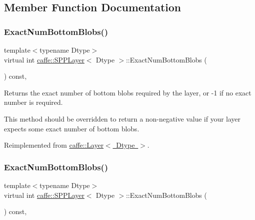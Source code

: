 \subsection{Member Function Documentation}
\mbox{\label{classcaffe_1_1_s_p_p_layer_a0fcc7996823cba1a468e82b3f9058ff0}} 
\subsubsection{\texorpdfstring{Exact\+Num\+Bottom\+Blobs()}{ExactNumBottomBlobs()}\hspace{0.1cm}{\footnotesize\ttfamily [1/2]}}
{\footnotesize\ttfamily template$<$typename Dtype$>$ \\
virtual int \mbox{\hyperlink{classcaffe_1_1_s_p_p_layer}{caffe\+::\+S\+P\+P\+Layer}}$<$ Dtype $>$\+::Exact\+Num\+Bottom\+Blobs (\begin{DoxyParamCaption}{ }\end{DoxyParamCaption}) const\hspace{0.3cm}{\ttfamily [inline]}, {\ttfamily [virtual]}}



Returns the exact number of bottom blobs required by the layer, or -\/1 if no exact number is required. 

This method should be overridden to return a non-\/negative value if your layer expects some exact number of bottom blobs. 

Reimplemented from \mbox{\hyperlink{classcaffe_1_1_layer_a8e5ee0494d85f5f55fc4396537cbc60f}{caffe\+::\+Layer$<$ Dtype $>$}}.

\mbox{\label{classcaffe_1_1_s_p_p_layer_a0fcc7996823cba1a468e82b3f9058ff0}} 
\subsubsection{\texorpdfstring{Exact\+Num\+Bottom\+Blobs()}{ExactNumBottomBlobs()}\hspace{0.1cm}{\footnotesize\ttfamily [2/2]}}
{\footnotesize\ttfamily template$<$typename Dtype$>$ \\
virtual int \mbox{\hyperlink{classcaffe_1_1_s_p_p_layer}{caffe\+::\+S\+P\+P\+Layer}}$<$ Dtype $>$\+::Exact\+Num\+Bottom\+Blobs (\begin{DoxyParamCaption}{ }\end{DoxyParamCaption}) const\hspace{0.3cm}{\ttfamily [inline]}, {\ttfamily [virtual]}}



